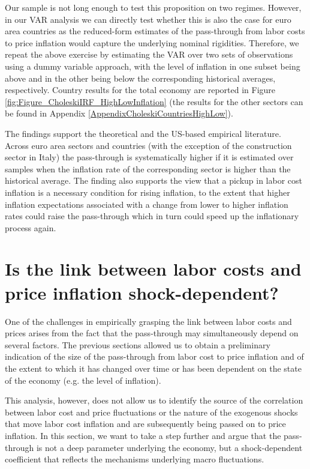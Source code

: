 \documentclass[11pt]{article}
\begin{document}
Our sample is not long enough to test this proposition on two regimes. However, in our VAR analysis we can directly test whether this is also the case for euro area countries as the reduced-form estimates of the pass-through from labor costs to price inflation would capture the underlying nominal rigidities. Therefore, we repeat the above exercise by estimating the VAR over two sets of observations using a dummy variable approach, with the level of inflation in one subset being above and in the other being below the corresponding historical averages, respectively. Country results for the total economy are reported in Figure \ref{fig:Figure_CholeskiIRF_HighLowInflation} (the results for the other sectors can be found in Appendix \ref{AppendixCholeskiCountriesHighLow}).

The findings support the theoretical and the US-based empirical literature. Across euro area sectors and countries (with the exception of the construction sector in Italy) the pass-through is systematically higher if it is estimated over samples when the inflation rate of the corresponding sector is higher than the historical average. The finding also supports the view that a pickup in labor cost inflation is a necessary condition for rising inflation, to the extent that higher inflation expectations associated with a change from lower to higher inflation rates could raise the pass-through which in turn could speed up the inflationary process again.

\section{Is the link between labor costs and price inflation shock-dependent?}
One of the challenges in empirically grasping the link between labor costs and prices arises from the fact that the pass-through may simultaneously depend on several factors. The previous sections allowed us to obtain a preliminary indication of the size of the pass-through from labor cost to price inflation and of the extent to which it has changed over time or has been dependent on the state of the economy (e.g. the level of inflation). 

This analysis, however, does not allow us to identify the source of the correlation between labor cost and price fluctuations or the nature of the exogenous shocks that move labor cost inflation and are subsequently being passed on to price inflation. In this section, we want to take a step further and argue that the pass-through is not a deep parameter underlying the economy, but a shock-dependent coefficient that reflects the mechanisms underlying macro fluctuations.
\end{document}
